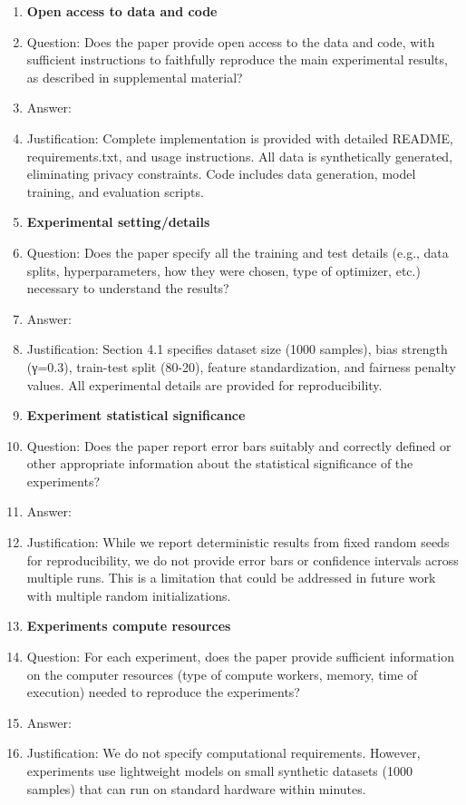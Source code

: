 \documentclass{article}
\begin{document}
\begin{enumerate}
\item {\bf Open access to data and code}
    \item[] Question: Does the paper provide open access to the data and code, with sufficient instructions to faithfully reproduce the main experimental results, as described in supplemental material?
    \item[] Answer: \answerYes{}
    \item[] Justification: Complete implementation is provided with detailed README, requirements.txt, and usage instructions. All data is synthetically generated, eliminating privacy constraints. Code includes data generation, model training, and evaluation scripts.

\item {\bf Experimental setting/details}
    \item[] Question: Does the paper specify all the training and test details (e.g., data splits, hyperparameters, how they were chosen, type of optimizer, etc.) necessary to understand the results?
    \item[] Answer: \answerYes{}
    \item[] Justification: Section 4.1 specifies dataset size (1000 samples), bias strength (γ=0.3), train-test split (80-20), feature standardization, and fairness penalty values. All experimental details are provided for reproducibility.

\item {\bf Experiment statistical significance}
    \item[] Question: Does the paper report error bars suitably and correctly defined or other appropriate information about the statistical significance of the experiments?
    \item[] Answer: \answerNo{}
    \item[] Justification: While we report deterministic results from fixed random seeds for reproducibility, we do not provide error bars or confidence intervals across multiple runs. This is a limitation that could be addressed in future work with multiple random initializations.

\item {\bf Experiments compute resources}
    \item[] Question: For each experiment, does the paper provide sufficient information on the computer resources (type of compute workers, memory, time of execution) needed to reproduce the experiments?
    \item[] Answer: \answerNo{}
    \item[] Justification: We do not specify computational requirements. However, experiments use lightweight models on small synthetic datasets (1000 samples) that can run on standard hardware within minutes.


\end{enumerate}
\end{document}
